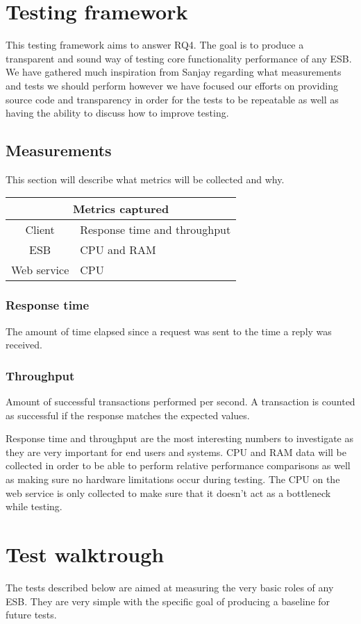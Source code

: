 \section{Testing framework}
This testing framework aims to answer RQ4. The goal is to produce a transparent and sound way of testing core functionality \cite{lit review} performance of any ESB. 
We have gathered much inspiration from Sanjay \cite{Sanjay} regarding what measurements and tests we should perform however we have focused our efforts on providing source code and transparency in order for the tests to be repeatable as well as having the ability to discuss how to improve testing.

\subsection{Measurements}
This section will describe what metrics will be collected and why.

\begin{tabular}{| c | l |}
	\hline
	\multicolumn{2}{|c|}{Metrics captured} \\
	\hline
	Client & Response time and throughput \\ \hline
	ESB & CPU and RAM \\ \hline
	Web service &  CPU \\ \hline
\end{tabular}
\subsubsection{Response time}
The amount of time elapsed since a request was sent to the time a reply was received.
\subsubsection{Throughput}
Amount of successful transactions performed per second. A transaction is counted as successful if the response matches the expected values.


Response time and throughput are the most interesting numbers to investigate as they are very important for end users and systems. CPU and RAM data will be collected in order to be able to perform relative performance comparisons as well as making sure no hardware limitations occur during testing. The CPU on the web service is only collected to make sure that it doesn't act as a bottleneck while testing. 

\section{Test walktrough}
The tests described below are aimed at measuring the very basic roles of any ESB. They are very simple with the specific goal of producing a baseline for future tests.

